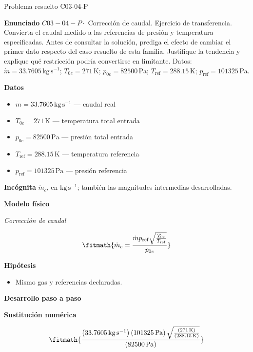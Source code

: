 \documentclass[10pt,openany]{book}
\begin{document}
\begin{studiumworked}{Problema resuelto C03-04-P}


\noindent\textbf{Enunciado}
\(C03-04-P \cdot\) Corrección de caudal. Ejercicio de transferencia. Convierta el caudal medido a las referencias de presión y temperatura especificadas. Antes de consultar la solución, prediga el efecto de cambiar el primer dato respecto del caso resuelto de esta familia. Justifique la tendencia y explique qué restricción podría convertirse en limitante. Datos: \(\dot m=33.7605\, \mathrm{kg}\,\mathrm{s}^{-1}\); \(T_{0e}=271\, \mathrm{K}\); \(p_{0e}=82500\, \mathrm{Pa}\); \(T_{\mathrm{ref}}=288.15\, \mathrm{K}\); \(p_{\mathrm{ref}}=101325\, \mathrm{Pa}\).

\noindent\textbf{Datos}
\begin{itemize}
\item $\dot m = 33.7605\,\mathrm{kg}\,\mathrm{s}^{-1}$ — caudal real
\item $T_{0e} = 271\,\mathrm{K}$ — temperatura total entrada
\item $p_{0e} = 82500\,\mathrm{Pa}$ — presión total entrada
\item $T_{\mathrm{ref}} = 288.15\,\mathrm{K}$ — temperatura referencia
\item $p_{\mathrm{ref}} = 101325\,\mathrm{Pa}$ — presión referencia
\end{itemize}

\noindent\textbf{Incógnita}
$\dot{m}_c$, en $\mathrm{kg\,s^{-1}}$; también las magnitudes intermedias desarrolladas.

\noindent\textbf{Modelo físico}

\noindent\textit{Corrección de caudal}

\[
\fitmath{\dot{m}_c=\frac{\dot m p_{\mathrm{ref}} \sqrt{\frac{T_{0e}}{T_{\mathrm{ref}}}}}{p_{0e}}}
\]

\noindent\textbf{Hipótesis}
\begin{itemize}
\item Mismo gas y referencias declaradas.
\end{itemize}

\noindent\textbf{Desarrollo paso a paso}



\noindent\textbf{Sustitución numérica}

\[
\fitmath{\frac{\left(33.7605\,\mathrm{kg}\,\mathrm{s}^{-1}\right) \left(101325\,\mathrm{Pa}\right) \sqrt{\frac{\left(271\,\mathrm{K}\right)}{\left(288.15\,\mathrm{K}\right)}}}{\left(82500\,\mathrm{Pa}\right)}}
\]


\end{studiumworked}
\end{document}
